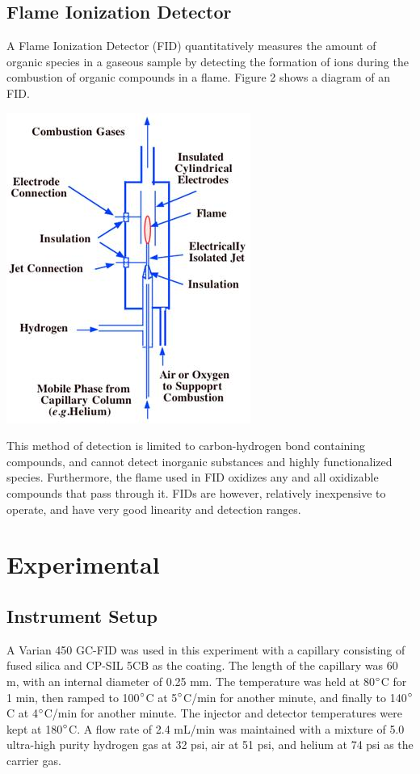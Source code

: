 \documentclass{article}
\begin{document}
\begin{multicols}{2}
{\subsection*{Flame Ionization Detector}
    A Flame Ionization Detector (FID) quantitatively measures the amount of organic species
in a gaseous sample by detecting the formation of ions during the combustion of
organic compounds in a flame. Figure 2 shows a diagram of an FID.
    \begin{center}
        \includegraphics[scale=0.5]{fid.png}
    \end{center}

This method of detection is limited to carbon-hydrogen bond containing compounds, and cannot
detect inorganic substances and highly functionalized species. Furthermore, the
flame used in FID oxidizes any and all oxidizable compounds that pass through
it. FIDs are however, relatively inexpensive to operate, and have very good
linearity and detection ranges. \cite{Harris}

\section*{Experimental}
\subsection*{Instrument Setup}
A Varian 450 GC-FID was used in this experiment with a capillary consisting of
fused silica and CP-SIL 5CB as the coating. The length of the capillary was 60
m, with an internal diameter of 0.25 mm. The temperature was held at
80$\degree$C for 1 min, then ramped to 100$\degree$C at 5$\degree$C/min for
another minute, and finally to 140$\degree$C at 4$\degree$C/min for another
minute.  The injector and detector temperatures were kept at 180$\degree$C.  A
flow rate of 2.4 mL/min was maintained with a mixture of 5.0 ultra-high purity
hydrogen gas at 32 psi, air at 51 psi, and helium at 74 psi as the carrier gas.

}
\end{multicols}
\end{document}

